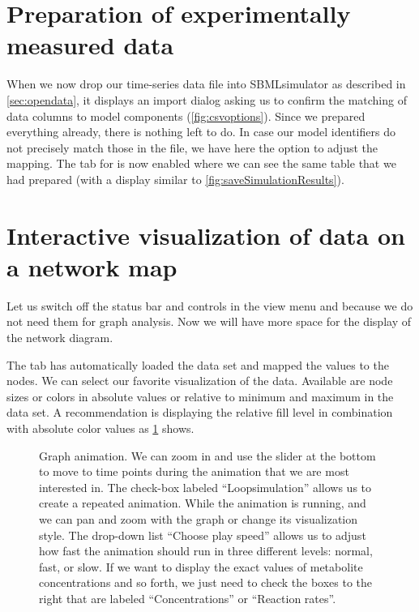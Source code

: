 \section{Preparation of experimentally measured data}

When we now drop our time-series data file into SBMLsimulator as described in \cref{sec:opendata}, it displays an import dialog asking us to confirm the matching of data columns to model components (\cref{fig:csvoptions}).
Since we prepared everything already, there is nothing left to do.
In case our model identifiers do not precisely match those in the \CSV file, we have here the option to adjust the mapping.
The tab for  is now enabled where we can see the same table that we had prepared (with a display similar to \cref{fig:saveSimulationResults}).

\section{Interactive visualization of data on a network map}

Let us switch off the status bar and controls in the view menu  and  because we do not need them for graph analysis.
Now we will have more space for the display of the network diagram.

The  tab has automatically loaded the data set and mapped the values to the nodes. 
We can select our favorite visualization of the data.
Available are node sizes or colors in absolute values or relative to minimum and maximum in the data set.
A recommendation is displaying the relative fill level in combination with absolute color values as \cref{fig:GraphAnimation} shows.
\begin{figure}[htb]
  \caption[Graph animation]{Graph animation.
  We can zoom in and use the slider at the bottom to move to time points during the animation that we are most interested in.
  The check-box labeled ``Loopsimulation'' allows us to create a repeated animation.
  While the animation is running, and we can pan and zoom with the graph or change its visualization style.
  The drop-down list ``Choose play speed'' allows us to adjust how fast the animation should run in three different levels: normal, fast, or slow.
If we want to display the exact values of metabolite concentrations and so forth, we just need to check the boxes to the right that are labeled ``Concentrations'' or ``Reaction rates''.}
  \label{fig:GraphAnimation}
\end{figure}

